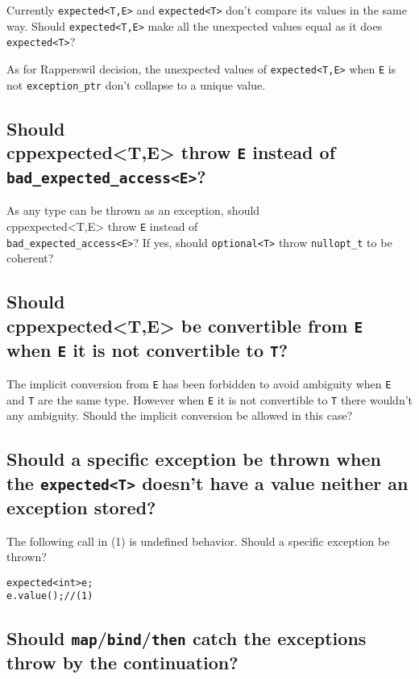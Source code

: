 \documentclass[a4paper,10pt]{article}
\newcommand{\cpp}[1]{\lstinline{#1}}
\begin{document}
Currently \cpp{expected<T,E>} and \cpp{expected<T>} don't compare its values in the same way.
Should \cpp{expected<T,E>} make all the unexpected values equal as it does \cpp{expected<T>}?

As for Rapperswil decision, the unexpected values of \cpp{expected<T,E>} when \cpp{E} is not \cpp{exception_ptr} don't collapse to a unique value.

\subsection{Should \\cpp{expected<T,E>} throw \cpp{E} instead of \cpp{bad_expected_access<E>}?}

As any type can be thrown as an exception, should \\cpp{expected<T,E>} throw \cpp{E} instead of \\
\cpp{bad_expected_access<E>}? 
If yes, should \cpp{optional<T>} throw \cpp{nullopt_t} to be coherent? 

\subsection{Should \\cpp{expected<T,E>} be convertible from \cpp{E} when \cpp{E} it is not convertible to \cpp{T}?}

The implicit conversion from \cpp{E} has been forbidden to avoid ambiguity when \cpp{E} and \cpp{T} are the same type. 
However when \cpp{E} it is not convertible to \cpp{T} there wouldn't any ambiguity. 
Should the implicit conversion be allowed in this case?

\subsection{Should a specific exception be thrown when the \cpp{expected<T>} doesn't have a value neither an exception stored?}

The following call in (1) is undefined behavior. Should a specific exception be thrown?

\begin{alltt}
expected<int> e;
e.value(); // (1)
\end{alltt}

\subsection{Should \cpp{map}/\cpp{bind}/\cpp{then} catch the exceptions throw by the continuation?}
\end{document}
